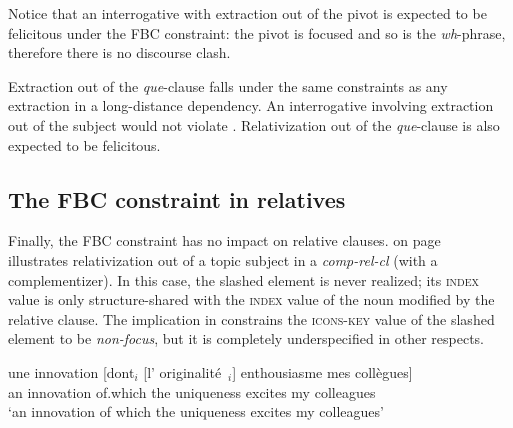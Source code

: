 Notice that an interrogative with extraction out of the pivot is expected to be felicitous under the FBC constraint: the pivot is focused and so is the \emph{wh}-phrase, therefore there is no discourse clash.

\eal 
{}
\zl 

Extraction out of the \emph{que}-clause falls under the same constraints as any extraction in a long-distance dependency. An interrogative involving extraction out of the subject would not violate . Relativization out of the \emph{que}-clause is also expected to be felicitous.

\subsection{The FBC constraint in relatives}

Finally, the FBC constraint has no impact on  relative clauses.  on page~\pageref{fig:FBC-topic-subject-rc} illustrates relativization out of a topic subject in a \emph{comp-rel-cl} (with a complementizer). In this case, the slashed element is never realized; its \textsc{index} value is only structure-shared with the \textsc{index} value of the noun modified by the relative clause. The implication in  constrains the \textsc{icons-key} value of the slashed element to be \emph{non-focus}, but it is completely underspecified in other respects. 

\ea
\gll une innovation [dont$_i$ [l' originalité~\trace{}$_i$] enthousiasme mes collègues]\\
an innovation \sbar{}of.which \sbar{}the uniqueness excites my colleagues\\
\glt `an innovation of which the uniqueness excites my colleagues'
\label{ex:FBC-topic-subject-rc}
\z 



